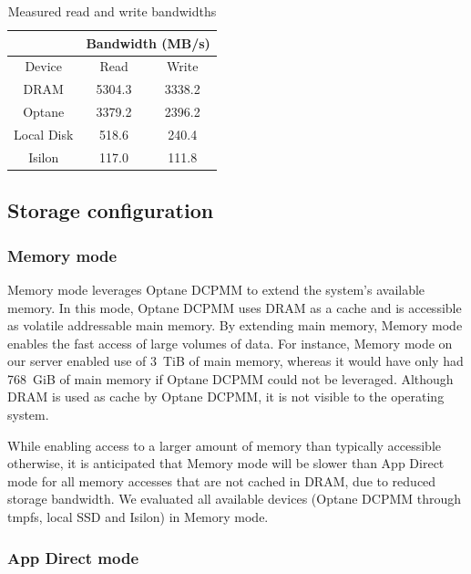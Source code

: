 \begin{table}
\begin{center}
 \begin{tabular}{ |c|c|c| } 
     \cline{2-3}
     \multicolumn{1}{c|}{} & \multicolumn{2}{c|}{Bandwidth (MB/s)} \\\hline
  Device & Read & Write \\
 \hline
 DRAM & 5304.3 & 3338.2 \\  
 Optane & 3379.2 & 2396.2 \\   
 Local Disk & 518.6 & 240.4 \\
 Isilon & 117.0 & 111.8 \\
 \hline
\end{tabular}\caption{Measured read and write
bandwidths}\label{table:optane:bandwidths}
\end{center}
\end{table}



\subsection{Storage configuration}

\subsubsection{Memory mode}

Memory mode leverages Optane DCPMM to extend the system's available memory. In
this mode, Optane DCPMM uses DRAM as a cache and is accessible as volatile
addressable main memory. By extending main memory, Memory mode enables the fast
access of large volumes of data. For instance, Memory mode on our server enabled
use of 3~TiB of main memory, whereas it would have only had 768~GiB of main
memory if Optane DCPMM could not be leveraged. Although DRAM is used as cache by
Optane DCPMM, it is not visible to the operating system. 

While enabling access to a larger amount of memory than typically accessible
otherwise, it is anticipated that Memory mode will be slower than App Direct
mode for all memory accesses that are not cached in DRAM, due to reduced storage
bandwidth. We evaluated all available devices (Optane DCPMM through tmpfs, local
SSD and Isilon) in Memory mode.

\subsubsection{App Direct mode}

